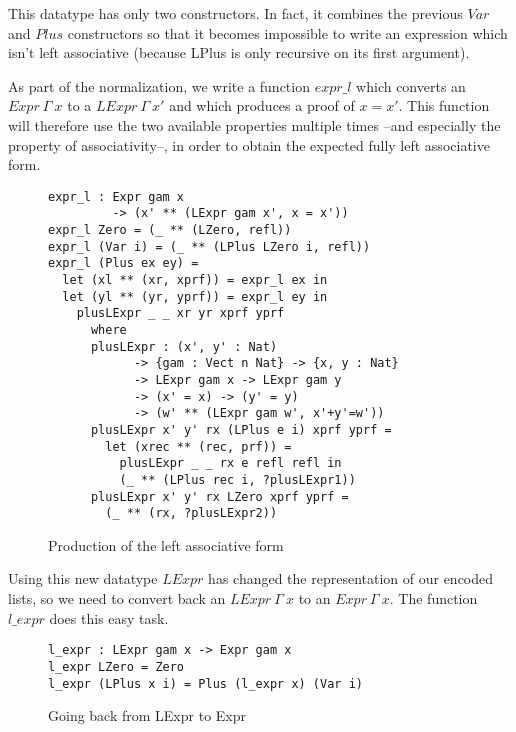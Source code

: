 This datatype has only two constructors. In fact, it combines the previous $Var$ and $Plus$ constructors so that it becomes impossible to write an expression which isn't left associative (because LPlus is only recursive on its first argument).
 
As part of the normalization, we write a function $expr\_l$ which converts an $Expr\ \Gamma\ x$ to a $LExpr\ \Gamma\ x'$ and which produces a proof of $x=x'$. This function will therefore use the two available properties multiple times --and especially the property of associativity--, in order to obtain the expected fully left associative form. 

\begin{figure}[H]
\figrule
\begin{center}
\begin{verbatim}
expr_l : Expr gam x 
         -> (x' ** (LExpr gam x', x = x'))
expr_l Zero = (_ ** (LZero, refl))
expr_l (Var i) = (_ ** (LPlus LZero i, refl))
expr_l (Plus ex ey) = 
  let (xl ** (xr, xprf)) = expr_l ex in
  let (yl ** (yr, yprf)) = expr_l ey in
    plusLExpr _ _ xr yr xprf yprf
      where 
      plusLExpr : (x', y' : Nat)
            -> {gam : Vect n Nat} -> {x, y : Nat} 
            -> LExpr gam x -> LExpr gam y 
            -> (x' = x) -> (y' = y) 
            -> (w' ** (LExpr gam w', x'+y'=w'))
      plusLExpr x' y' rx (LPlus e i) xprf yprf =
        let (xrec ** (rec, prf)) = 
          plusLExpr _ _ rx e refl refl in
          (_ ** (LPlus rec i, ?plusLExpr1))
      plusLExpr x' y' rx LZero xprf yprf =
        (_ ** (rx, ?plusLExpr2))
\end{verbatim}
\end{center}
\caption{Production of the left associative form}
\figrule
\end{figure}


Using this new datatype $LExpr$ has changed the representation of our encoded lists, so we need to convert back an $LExpr\ \Gamma\ x$ to an $Expr\ \Gamma\ x$. The function $l\_expr$ does this easy task.
\begin{figure}[H]
\figrule
\begin{center}
\begin{verbatim}
l_expr : LExpr gam x -> Expr gam x
l_expr LZero = Zero
l_expr (LPlus x i) = Plus (l_expr x) (Var i)
\end{verbatim}
\end{center}
\caption{Going back from LExpr to Expr}
\figrule
\end{figure}


